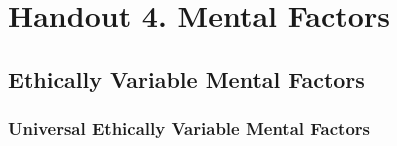 \documentclass[a4 paper, 12pt]{article}
\begin{document}
\pagestyle{empty}

\section*{Handout 4. Mental Factors}

\subsection*{Ethically Variable Mental Factors}

\subsubsection*{Universal Ethically Variable Mental Factors}

\setlength{\tabcolsep}{0pt}
\renewcommand{\arraystretch}{1.1}
\end{document}
